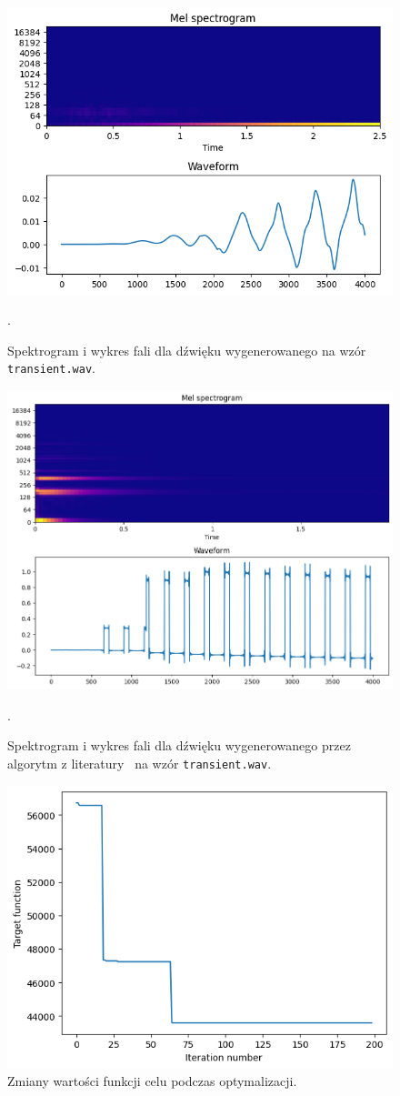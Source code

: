 \begin{figure}[H]
    \centering
    \includegraphics[width=0.7\linewidth]{rys06/evolved_sample_transient.png}
    \caption{
      Spektrogram i wykres fali dla dźwięku wygenerowanego na wzór
      \texttt{transient.wav}.
    }\label{fig:evolved_transient_sound_overview}.
\end{figure}

\begin{figure}[H]
    \centering
    \includegraphics[width=0.7\linewidth]{rys06/macret_evolved_transient.png}
    \caption{
      Spektrogram i wykres fali dla dźwięku wygenerowanego 
      przez algorytm z literatury~\cite{evolutionary_puredata} na wzór
      \texttt{transient.wav}.
    }\label{fig:evolved_literature_transient_sound_overview}.
\end{figure}

\begin{figure}[H]
    \centering
    \includegraphics[width=0.6\linewidth]{rys06/transient_target_fun_values.png}
    \caption{
      Zmiany wartości funkcji celu podczas optymalizacji.
    }%
\end{figure}

